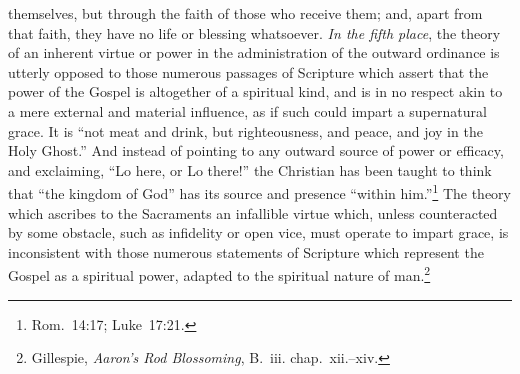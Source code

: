 \documentclass[
]{book}
\begin{document}
themselves, but through the faith of those who receive them; and, apart from that faith, they have no life or blessing whatsoever. \emph{In the fifth place}, the theory of an inherent virtue or power in the administration of the outward ordinance is utterly opposed to those numerous passages of Scripture which assert that the power of the Gospel is altogether of a spiritual kind, and is in no respect akin to a mere external and material influence, as if such could impart a supernatural grace. It is ``not meat and drink, but righteousness, and peace, and joy in the Holy Ghost.'' And instead of pointing to any outward source of power or efficacy, and exclaiming, ``Lo here, or Lo there!'' the Christian has been taught to think that ``the kingdom of God'' has its source and presence ``within him.''\footnote{Rom.~14:17; Luke~17:21.} The theory which ascribes to the Sacraments an infallible virtue which, unless counteracted by some obstacle, such as infidelity or open vice, must operate to impart grace, is inconsistent with those numerous statements of Scripture which represent the Gospel as a spiritual power, adapted to the spiritual nature of man.\footnote{Gillespie, \emph{Aaron's Rod Blossoming}, B.~iii. chap.~xii.--xiv.}
\end{document}
